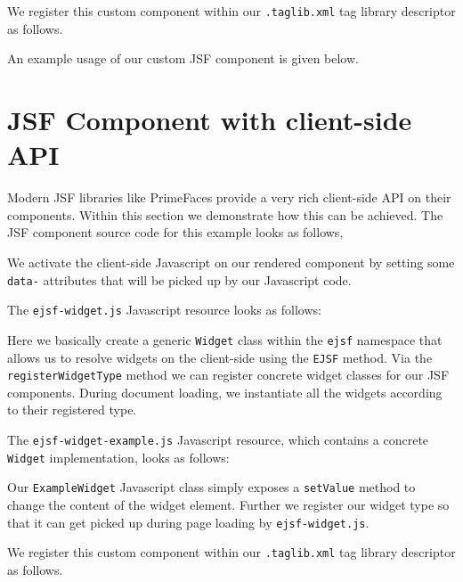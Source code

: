 We register this custom component within our \texttt{.taglib.xml} tag library descriptor as follows.


An example usage of our custom JSF component is given below.


\section{JSF Component with client-side API}
Modern JSF libraries like PrimeFaces provide a very rich client-side API on their components.
Within this section we demonstrate how this can be achieved.
The JSF component source code for this example looks as follows,

We activate the client-side Javascript on our rendered component by setting some \texttt{data-} attributes that will be picked up by our Javascript code.

The \texttt{ejsf-widget.js} Javascript resource looks as follows:

Here we basically create a generic \texttt{Widget} class within the \texttt{ejsf} namespace that allows us to resolve widgets on the client-side using the \texttt{EJSF} method.
Via the \texttt{registerWidgetType} method we can register concrete widget classes for our JSF components.
During document loading, we instantiate all the widgets according to their registered type.

The \texttt{ejsf-widget-example.js} Javascript resource, which contains a concrete \texttt{Widget} implementation, looks as follows:

Our \texttt{ExampleWidget} Javascript class simply exposes a \texttt{setValue} method to change the content of the widget element.
Further we register our widget type so that it can get picked up during page loading by \texttt{ejsf-widget.js}.

We register this custom component within our \texttt{.taglib.xml} tag library descriptor as follows.


